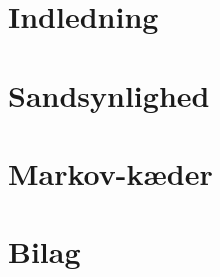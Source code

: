 

 




\chapter{Indledning} 
    

\chapter{Sandsynlighed}\label{kapitel:sandsynlighed}


%

\chapter{Markov-kæder}


\chapter{Bilag}
    


\cite{hoel1986introduction}
\cite{kaas2008modern}


